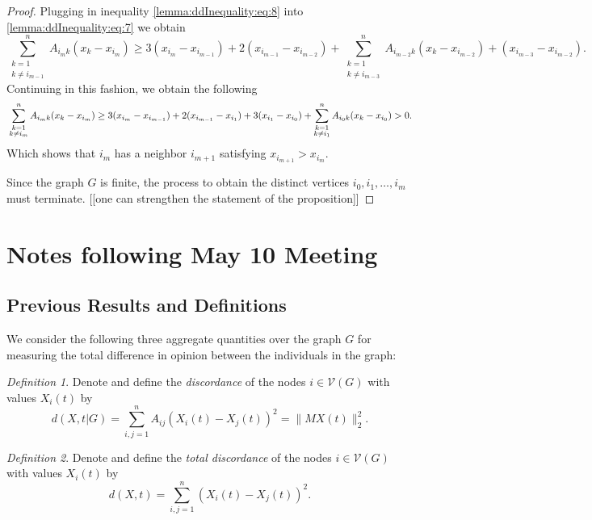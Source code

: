 \documentclass{article}
\theoremstyle{remark}
\newtheorem{definition}{Definition}
\begin{document}
\begin{proof}
	Plugging in inequality \eqref{lemma:ddInequality:eq:8} into \eqref{lemma:ddInequality:eq:7} we obtain
	\begin{equation}
		\sum_{\substack{k=1\\k\neq i_{m-1}}}^nA_{i_mk}(x_k-x_{i_m}) \geq 3(x_{i_m}-x_{i_{m-1}}) + 2(x_{i_{m-1}}-x_{i_{m-2}}) + \sum_{\substack{k=1\\k\neq i_{m-3}}}^nA_{i_{m-2}k}(x_k-x_{i_{m-2}}) + (x_{i_{m-3}}-x_{i_{m-2}}).
	\end{equation}
	Continuing in this fashion, we obtain the following
	\begin{equation}{\label{lemma:ddInequality:eq:7}}
		\sum_{\substack{k=1\\k\neq i_{m}}}^nA_{i_mk}(x_k-x_{i_m}) \geq 3(x_{i_m}-x_{i_{m-1}}) + 2(x_{i_{m-1}}-x_{i_1}) + 3(x_{i_1}-x_{i_0}) + \sum_{\substack{k=1\\k\neq i_1}}^nA_{i_0k}(x_k-x_{i_0}) > 0.
	\end{equation}
	Which shows that $i_m$ has a neighbor $i_{m+1}$ satisfying $x_{i_{m+1}}>x_{i_m}$.

	Since the graph $G$ is finite, the process to obtain the distinct vertices $i_0,i_1,\ldots,i_m$ must terminate. [[one can strengthen the statement of the proposition]]
\end{proof}

\section{Notes following May 10 Meeting}

\subsection{Previous Results and Definitions}

We consider the following three aggregate quantities over the graph $G$ for measuring the total difference in opinion between the individuals in the graph:
\begin{definition}{\label{defn:discordance}}
	Denote and define the \textit{discordance} of the nodes $i\in\mathcal{V}(G)$ with values $X_i(t)$ by 
\begin{equation*}
	d(X,t|G) = \sum_{i,j=1}^nA_{ij}(X_i(t)-X_j(t))^2 = \|MX(t)\|_2^2.
\end{equation*}
\end{definition}

\begin{definition}{\label{defn:totalDiscordance}}
	Denote and define the \textit{total discordance} of the nodes $i\in\mathcal{V}(G)$ with values $X_i(t)$ by
\begin{equation*}
	d(X,t)= \sum_{i,j=1}^n(X_i(t)-X_j(t))^2.
\end{equation*}
\end{definition}
\end{document}
